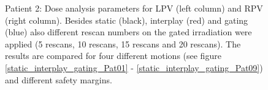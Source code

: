 \documentclass[type=dr, dr=rernat, accentcolor=tud7b,colorbacktitle, bigchapter, openright, twoside, 12pt ]{tudthesis}
\begin{document}
\begin{figure}[H]
{ }
\caption{Patient 2: Dose analysis parameters for LPV (left column) and RPV (right column). Besides static (black), interplay (red) and gating 
(blue) also different rescan numbers on the gated irradiation were applied (5 rescans, 10 rescans, 15 rescans and 20 rescans). The results
are compared for four different motions (see figure \ref{static_interplay_gating_Pat01} - \ref{static_interplay_gating_Pat09}) and different 
safety margins.}
\label{static_interplay_gating_rescan_Pat02}
\end{figure}

\begin{figure}[H]
\end{figure}
\end{document}
